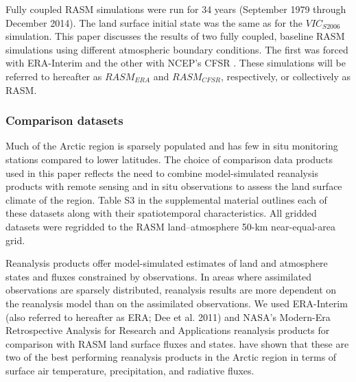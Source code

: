 Fully coupled RASM simulations were run for 34 years (September 1979 through December 2014).
The land surface initial state was the same as for the $VIC_{S2006}$ simulation.
This paper discusses the results of two fully coupled, baseline RASM simulations using different atmospheric boundary conditions.
The first was forced with ERA-Interim \citep{Dee_2011} and the other with NCEP’s CFSR \citep{Saha_2011}.
These simulations will be referred to hereafter as $RASM_{ERA}$ and $RASM_{CFSR}$, respectively, or collectively as RASM.

\subsubsection{Comparison datasets}
\label{sec:datasets}

Much of the Arctic region is sparsely populated and has few in situ monitoring stations compared to lower latitudes.
The choice of comparison data products used in this paper reflects the need to combine model-simulated reanalysis products with remote sensing and in situ observations to assess the land surface climate of the region.
Table S3 in the supplemental material outlines each of these datasets along with their spatiotemporal characteristics.
All gridded datasets were regridded to the RASM land–atmosphere 50-km near-equal-area grid.

Reanalysis products offer model-simulated estimates of land and atmosphere states and fluxes constrained by observations.
In areas where assimilated observations are sparsely distributed, reanalysis results are more dependent on the reanalysis model than on the assimilated observations.
We used ERA-Interim (also referred to hereafter as ERA; Dee et al. 2011) and NASA’s Modern-Era Retrospective Analysis for Research and Applications \citep[MERRA; ][]{Rienecker_2011} reanalysis products for comparison with RASM land surface fluxes and states.
\citet{Lindsay_2014} have shown that these are two of the best performing reanalysis products in the Arctic region in terms of surface air temperature, precipitation, and radiative fluxes.

